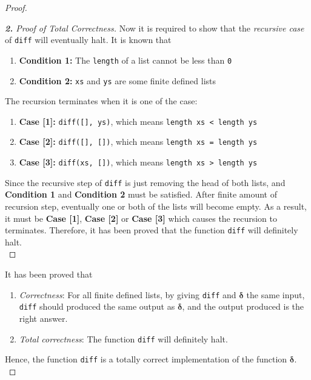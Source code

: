 \documentclass[12pt]{article}
\newcommand{\haskell}{\texttt}
\newenvironment{question}[2][Question]{\begin{trivlist}
\item[\hskip \labelsep {\bfseries #1}\hskip \labelsep {\bfseries #2.}]}{\end{trivlist}}
\begin{document}
\begin{proof}
\begin{proof}[\textbf{2.} Proof of Total Correctness]
Now it is required to show that the \emph{recursive case} of \haskell{diff} will eventually halt. It is known that
\begin{enumerate}
    \item \textbf{Condition 1:} The \haskell{length} of a list cannot be less than \haskell{0}
    \item \textbf{Condition 2:} \haskell{xs} and \haskell{ys} are some finite defined lists
\end{enumerate}
The recursion terminates when it is one of the case:
\begin{enumerate}
    \item \textbf{Case [1]:} \haskell{diff([], ys)}, which means \haskell{length xs < length ys}
    \item \textbf{Case [2]:} \haskell{diff([], [])}, which means \haskell{length xs = length ys}
    \item \textbf{Case [3]:} \haskell{diff(xs, [])}, which means \haskell{length xs > length ys}
\end{enumerate}
Since the recursive step of \haskell{diff} is just removing the head of both lists, and \textbf{Condition 1} and \textbf{Condition 2} must be satisfied. After finite amount of recursion step, eventually one or both of the lists will become empty. As a result, it must be \textbf{Case [1]}, \textbf{Case [2]} or \textbf{Case [3]} which causes the recursion to terminates. Therefore, it has been proved that the function \haskell{diff} will definitely halt. \\
\end{proof}

It has been proved that
\begin{enumerate}
    \item \emph{Correctness}: For all finite defined lists, by giving \haskell{diff} and $\bm{\delta}$ the same input, \haskell{diff} should produced the same output as $\bm{\delta}$, and the output produced is the right answer.
    \item \emph{Total correctness}: The function \haskell{diff} will definitely halt.
\end{enumerate}
Hence, the function \haskell{diff} is a totally correct implementation of the function $\bm{\delta}$. \\
\end{proof}


\newpage\begin{question}{4}
\end{question}
\end{document}
